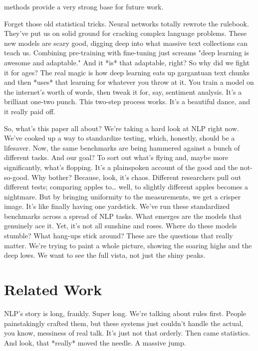 \documentclass{article}
\begin{document}
methods provide a very strong base for future work.

Forget those old statistical tricks. Neural networks totally rewrote the rulebook. They’ve put us on solid ground for cracking complex language problems. These new models are scary good, digging deep into what massive text collections can teach us. Combining pre-training with fine-tuning just screams "deep learning is awesome and adaptable." And it *is* that adaptable, right? So why did we fight it for ages? The real magic is how deep learning eats up gargantuan text chunks and then *uses* that learning for whatever you throw at it. You train a model on the internet's worth of words, then tweak it for, say, sentiment analysis. It’s a brilliant one-two punch. This two-step process works. It’s a beautiful dance, and it really paid off.

So, what's this paper all about? We’re taking a hard look at NLP right now. We've cooked up a way to standardize testing, which, honestly, should be a lifesaver. Now, the same benchmarks are being hammered against a bunch of different tasks. And our goal? To sort out what's flying and, maybe more significantly, what's flopping. It’s a plainspoken account of the good and the not-so-good. Why bother? Because, look, it’s chaos. Different researchers pull out different tests; comparing apples to… well, to slightly different apples becomes a nightmare. But by bringing uniformity to the measurements, we get a crisper image. It's like finally having one yardstick. We’ve run these standardized benchmarks across a spread of NLP tasks. What emerges are the models that genuinely ace it. Yet, it's not all sunshine and roses. Where do these models stumble? What hang-ups stick around? These are the questions that really matter. We’re trying to paint a whole picture, showing the soaring highs and the deep lows. We want to see the full vista, not just the shiny peaks.

\section{Related Work}

NLP's story is long, frankly. Super long. We're talking about rules first. People painstakingly crafted them, but these systems just couldn't handle the actual, you know, messiness of real talk. It's just not that orderly. Then came statistics. And look, that *really* moved the needle. A massive jump.
\end{document}
